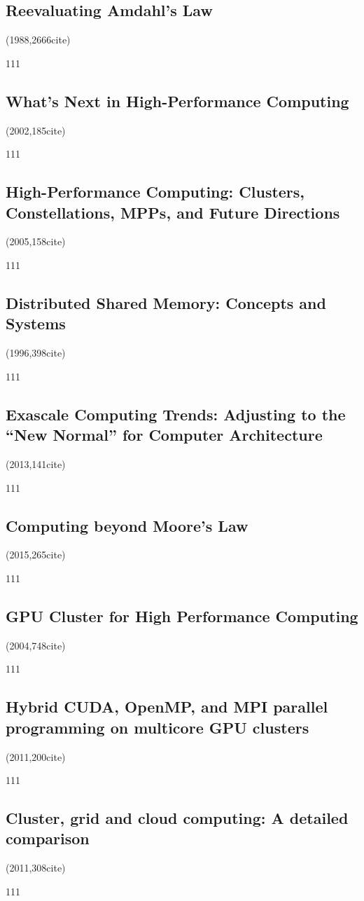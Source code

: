 \documentclass[a4paper,twoside]{scrbook}
\begin{document}
\subsection{Reevaluating Amdahl's Law\cite{gustafson1988reevaluating}}
(1988,2666cite)\par
111
\subsection{What’s Next in High-Performance Computing\cite{bell2002s}}
(2002,185cite)\par
111
\subsection{High-Performance Computing: Clusters, Constellations, MPPs, and Future Directions\cite{dongarra2005high}}
(2005,158cite)\par
111
\subsection{Distributed Shared Memory: Concepts and Systems \cite{protic1996distributed}}
(1996,398cite)\par
111
\par
\subsection{Exascale Computing Trends: Adjusting to the “New Normal” for Computer Architecture \cite{kogge2013exascale}}
(2013,141cite)\par
111
\subsection{Computing beyond Moore’s Law
\cite{shalf2015computing}}
(2015,265cite)\par
111
\subsection{GPU Cluster for High Performance Computing \cite{fan2004gpu}}
(2004,748cite)\par
111
\subsection{Hybrid CUDA, OpenMP, and MPI parallel programming on multicore GPU clusters \cite{yang2011hybrid}}
(2011,200cite)\par
111
\subsection{Cluster, grid and cloud computing: A detailed comparison \cite{sadashiv2011cluster}}
(2011,308cite)\par
111
\end{document}
